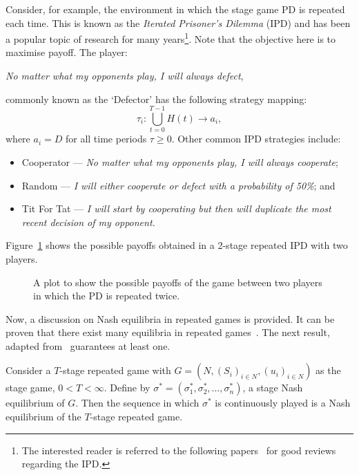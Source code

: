 Consider, for example, the environment in which the stage game PD is repeated each time. This is known as the \textit{Iterated Prisoner's
Dilemma} (IPD) and has been a popular topic of research for many
years\footnote{The interested reader is referred to the following papers~\cite{Glynatsi2019,Jurisic2012,ORiordan2001} for
good reviews regarding the IPD.}. Note that the objective
here is to maximise payoff. The player: 
\begin{center}
    \textit{No matter what my opponents play, I will always defect},
\end{center}
commonly known as the `Defector' has the following strategy mapping:
\begin{equation}
    \tau_{i} : \bigcup_{t = 0}^{T-1}{H(t)} \to a_{i},    
\end{equation}
where \(a_{i}=D\) for all time periods \(\tau \ge 0\). Other common IPD
strategies include: 
\begin{itemize}
    \item Cooperator --- \textit{No matter what my opponents play, I will always
    cooperate};
    \item Random --- \textit{I will either cooperate or defect with a probability of
    50\%}; and
    \item Tit For Tat --- \textit{I will start by cooperating but then will 
    duplicate the most recent decision of my opponent.}
\end{itemize}

Figure~\ref{fig:2-stage_payoff_plot} shows the possible payoffs obtained in
a 2-stage repeated IPD with two players.

\begin{figure}
    \centering
    \resizebox{0.5\textwidth}{!}{}
    \caption{A plot to show the possible payoffs of the game between two players in which the PD is repeated twice.}\label{fig:2-stage_payoff_plot}
\end{figure}

Now, a discussion on Nash equilibria in repeated games is provided. It can be
proven that there exist many equilibria in repeated
games~\cite{friedman1971non}. The next result,
adapted from~\cite{Knight2019a,maschler_solan_zamir_2013} guarantees at least
one.

\newpage
\begin{theorem}
    Consider a \(T\)-stage repeated game with \(G=(N, {(S_{i})}_{i \in N},
    {(u_{i})}_{i \in N})\) as the stage game, \(0 < T < \infty \). Define by
    \( {\sigma}^{*} = (\sigma_{1}^{*}, \sigma_{2}^{*}, \ldots,
    \sigma_{n}^{*})\), a stage Nash equilibrium of \(G\). Then the sequence in
    which \({\sigma}^{*}\) is continuously played is a Nash equilibrium of the
    \(T\)-stage repeated game.
\end{theorem}\label{thm:seq_of_stage_NE} 


